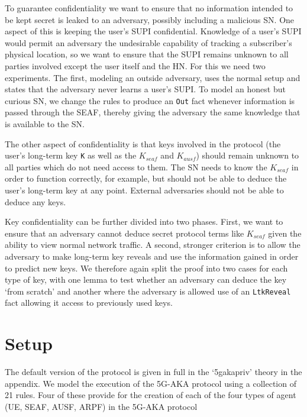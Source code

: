 \documentclass[10pt, pdftex]{article}
\begin{document}
To guarantee confidentiality we want to ensure that no information intended to be kept secret is leaked to an adversary, possibly including a malicious SN. One aspect of this is keeping the user's SUPI confidential. Knowledge of a user's SUPI would permit an adversary the undesirable capability of tracking a subscriber's physical location, so we want to ensure that the SUPI remains unknown to all parties involved except the user itself and the HN. For this we need two experiments. The first, modeling an outside adversary, uses the normal setup and states that the adversary never learns a user's SUPI. To model an honest but curious SN, we change the rules to produce an \verb|Out| fact whenever information is passed through the SEAF, thereby giving the adversary the same knowledge that is available to the SN.

The other aspect of confidentiality is that keys involved in the protocol (the user's long-term key \verb|K| as well as the $K_{seaf}$ and $K_{ausf}$) should remain unknown to all parties which do not need access to them. The SN needs to know the $K_{seaf}$ in order to function correctly, for example, but should not be able to deduce the user's long-term key at any point. External adversaries should not be able to deduce any keys.

Key confidentiality can be further divided into two phases. First, we want to ensure that an adversary cannot deduce secret protocol terms like $K_{seaf}$ given the ability to view normal network traffic. A second, stronger criterion is to allow the adversary to make long-term key reveals and use the information gained in order to predict new keys. We therefore again split the proof into two cases for each type of key, with one lemma to test whether an adversary can deduce the key `from scratch' and another where the adversary is allowed use of an \verb|LtkReveal| fact allowing it access to previously used keys.

\section{Setup}

The default version of the protocol is given in full in the `5gaka\textunderscore priv' theory in the appendix. We model the execution of the 5G-AKA protocol using a collection of 21 rules. Four of these provide for the creation of each of the four types of agent (UE, SEAF, AUSF, ARPF) in the 5G-AKA protocol
\end{document}
